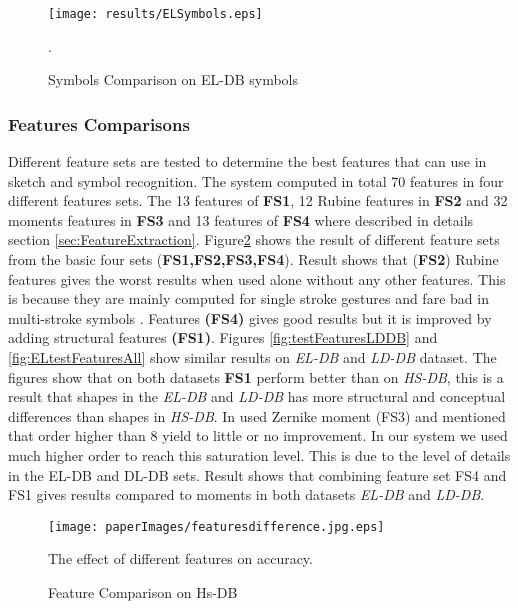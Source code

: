 \begin{figure}
	\centering
		\texttt{[image: results/ELSymbols.eps]}
	\caption{Symbols Comparison on EL-DB symbols}.  %
	\label{fig:ELtest2}
\end{figure}  
 
 
\subsubsection{Features Comparisons}
\label{sec:featuresComparisions}
Different feature sets are tested to determine the best features that can use in sketch and symbol recognition. The system computed in total 70 features in four different features sets. The 13 features of \textbf{FS1},  12 Rubine features in \textbf{FS2} and 32 moments features in \textbf{FS3} and 13 features of  \textbf{FS4} where described in details  section \ref{sec:FeatureExtraction}. Figure\ref{fig:testFeaturesAll} shows the result of different feature sets from the basic four sets (\textbf{FS1,FS2,FS3,FS4}). Result shows that (\textbf{FS2}) Rubine features \cite{gestureexample12} gives the worst results when used alone without any other features. This is because they are mainly computed for single stroke gestures and fare bad in multi-stroke symbols \cite{compareFeaturSVM}. Features \textbf{(FS4)} gives good results but it is improved by adding structural features \textbf{(FS1)}.  Figures \ref{fig:testFeaturesLDDB} and \ref{fig:ELtestFeaturesAll} show similar results on \textsl{EL-DB} and \textsl{LD-DB} dataset. The figures show that on both datasets \textbf{FS1} perform better than on \textsl{HS-DB}, this is a result that shapes in the \textsl{EL-DB} and \textsl{LD-DB} has more structural and conceptual differences than shapes in \textsl{HS-DB}. In \cite{HeloiseBeautification} used Zernike moment (FS3) and mentioned that order higher than 8 yield to little or no improvement. In our system we used much higher order to reach this saturation level. This is due to the level of details in the EL-DB and DL-DB sets.  Result shows that combining feature set FS4 and FS1 gives results compared to moments in both datasets \textsl{EL-DB} and \textsl{LD-DB}.    %




 \begin{figure}
	\centering
		\texttt{[image: paperImages/featuresdifference.jpg.eps]}
	\caption{Feature Comparison on Hs-DB} The effect of different features on accuracy.  %
	\label{fig:testFeaturesAll}
\end{figure}  


